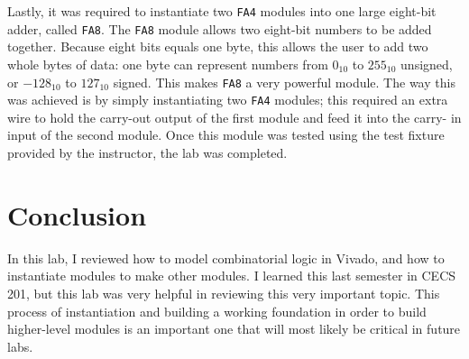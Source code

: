 \documentclass{article}
\renewcommand{\c}[1]{\texttt{#1}}
\begin{document}
Lastly, it was required to instantiate two \c{FA4} modules
into one large eight-bit adder, called \c{FA8}. The \c{FA8}
module allows two eight-bit numbers to be added together.
Because eight bits equals one byte, this allows the user to
add two whole bytes of data: one byte can represent numbers
from \(0_{10}\) to \(255_{10}\) unsigned, or \(-128_{10}\) to
\(127_{10}\) signed. This makes \c{FA8} a very powerful module.
The way this was achieved is by simply instantiating two
\c{FA4} modules; this required an extra wire to hold the
carry-out output of the first module and feed it into the carry-
in input of the second module. Once this module was tested
using the test fixture provided by the instructor, the
lab was completed.

\section{Conclusion} In this lab, I reviewed how to model
combinatorial logic in Vivado, and how to instantiate modules
to make other modules. I learned this last semester in CECS 201,
but this lab was very helpful in reviewing this very important
topic. This process of instantiation and building a working
foundation in order to build higher-level modules is an
important one that will most likely be critical in future labs.
\end{document}
